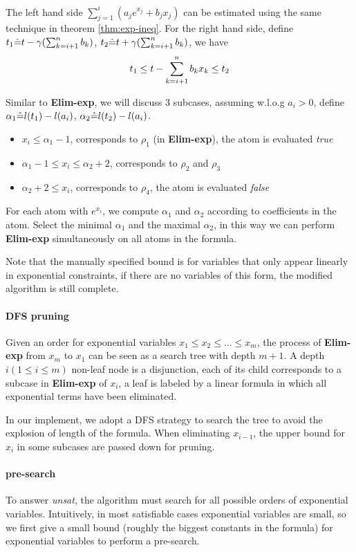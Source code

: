The left hand side $\sum_{j=1}^i (a_j e^{x_j} + b_j x_j)$ can be estimated using the same technique in theorem \ref{thm:exp-ineq}. For the right hand side, define  $ t_1 \hat{=} t-\gamma (\sum_{k=i+1}^n b_k)$, $t_2\hat{=} t+\gamma (\sum_{k=i+1}^n b_k)$, we have
\begin{equation}
    t_1  \le t - \sum_{k=i+1}^n b_k x_k \le  t_2 \notag
\end{equation} 

Similar to \textbf{Elim-exp}, we will discuss 3 subcases,
assuming w.l.o.g $a_i>0$, define $\alpha_1 \hat{=} l(t_1)-l(a_i)$, $\alpha_2 \hat{=} l(t_2)-l(a_i)$. 

\begin{itemize}
    \item $x_i\le \alpha_1 -1$, corresponds to $\rho_1$ (in \textbf{Elim-exp}), the atom is evaluated \textit{true}
    \item $\alpha_1 -1\le x_i \le \alpha_2 +2$, corresponds to $\rho_2$ and $\rho_3$
    \item $\alpha_2 + 2\le x_i$, corresponds to $\rho_4$, the atom is evaluated \textit{false}
\end{itemize}

For each atom with $e^{x_i}$, we compute $\alpha_1$ and $\alpha_2$ according to coefficients in the atom. Select the minimal $\alpha_1$ and the maximal $\alpha_2$, in this way we can perform \textbf{Elim-exp} simultaneously on all atoms in the formula.

Note that the manually specified bound is for variables that only appear linearly in exponential constraints, if there are no variables of this form, the modified algorithm is still complete.

\paragraph{DFS pruning}

Given an order for exponential variables $x_1\le x_2 \le ... \le x_m$, the process of \textbf{Elim-exp} from $x_m$ to $x_1$ can be seen as a search tree with depth $m+1$. A depth $i(1\le i\le m)$ non-leaf node is a disjunction, each of its child corresponds to a subcase in \textbf{Elim-exp} of $x_i$, a leaf is labeled by a linear formula in which all exponential terms have been eliminated.  

In our implement, we adopt a DFS strategy to search the tree to avoid the explosion of length of the formula. When eliminating $x_{i-1}$, the upper bound for $x_i$ in some subcases are passed down for pruning. 

\paragraph{pre-search}
To answer \textit{unsat}, the algorithm must search for all possible orders of exponential variables. Intuitively, in most satisfiable cases exponential variables are small, so we first give a small bound (roughly the biggest constants in the formula) for exponential variables to perform a pre-search.



